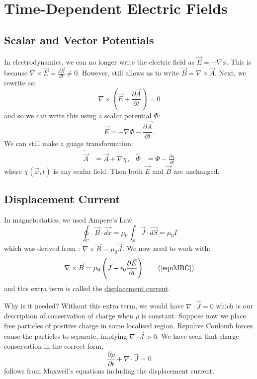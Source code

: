 \documentclass[../Main.tex]{subfiles}
\begin{document}
\section{Time-Dependent Electric Fields}
\subsection{Scalar and Vector Potentials}
In electrodynamics, we can no longer write the electric field as $\vec{E} = - \nabla \phi$. This is because $\nabla \times \vec{E} = \frac{d\vec{B}}{dt} \neq 0$. However,  still allows us to write $\vec{B} = \nabla \times \vec{A}$. Next, we rewrite  as:
\begin{equation*}
    \nabla \times \left(\vec{E} + \frac{\partial \vec{A}}{\partial t}\right) = 0
\end{equation*}
and so we can write this using a scalar potential $\Phi$:
\begin{equation*}
    \vec{E} = -\nabla \Phi - \frac{\partial \vec{A}}{\partial t}.
\end{equation*}
We can still make a guage transformation:
\begin{align*}
    \tilde{\vec{A}} &= \vec{A} + \nabla \chi, & \tilde{\Phi} &= \Phi - \frac{\partial \chi}{\partial t}
\end{align*}
where $\chi(\vec{x}, t)$ is any scalar field. Then both $\vec{E}$ and $\vec{B}$ are unchanged.
\subsection{Displacement Current}
In magnetostatics, we used Ampere's Law:
\begin{equation*}
    \oint_C \vec{B} \cdot \vec{dx} = \mu_0 \int_S \vec{J} \cdot \vec{dS} = \mu_0 I
\end{equation*}
which was derived from : $\nabla \times \vec{B} = \mu_0 \vec{J}$. We now need to work with:
\begin{equation*}
    \nabla \times \vec{B} = \mu_0 \left(\vec{J} + \epsilon_0 \frac{\partial \vec{E}}{\partial t}\right)
    \tag{\ref{eqnMBC}}
\end{equation*}
and this extra term is called the \underline{displacement current}.

Why is it needed? Without this extra term, we would have $\nabla \cdot \vec{J} = 0$ which is our description of conservation of charge when $\rho$ is constant. Suppose now we place free particles of positive charge in some localised region. Repulive Coulomb forces cause the particles to separate, implying $\nabla \cdot \vec{J} > 0$. We have seen that charge conservation in the correct form,
\begin{equation*}
    \frac{\partial \rho}{\partial t} + \nabla \cdot \vec{J} = 0
\end{equation*}
follows from Maxwell's equations including the displacement current.
\end{document}
